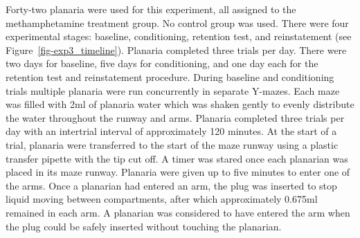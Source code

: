 \documentclass[
  jou,
  floatsintext,
  longtable,
  nolmodern,
  notxfonts,
  notimes,
  donotrepeattitle,
  colorlinks=true,linkcolor=blue,citecolor=blue,urlcolor=blue]{apa7}
\begin{document}
Forty-two planaria were used for this experiment, all assigned to the
methamphetamine treatment group. No control group was used. There
were four experimental stages: baseline, conditioning, retention test,
and reinstatement (see Figure~\ref{fig-exp3_timeline}). Planaria
completed three trials per day. There were two days for baseline, five
days for conditioning, and one day each for the retention test and
reinstatement procedure. During baseline and conditioning trials
multiple planaria were run concurrently in separate Y-mazes. Each maze
was filled with 2ml of planaria water which was shaken gently to evenly
distribute the water throughout the runway and arms. Planaria completed
three trials per day with an intertrial interval of approximately 120
minutes. At the start of a trial, planaria were transferred to the start
of the maze runway using a plastic transfer pipette with the tip cut
off. A timer was stared once each planarian was placed in its maze
runway. Planaria were given up to five minutes to enter one of the arms.
Once a planarian had entered an arm, the plug was inserted to stop
liquid moving between compartments, after which approximately 0.675ml
remained in each arm. A planarian was considered to have
entered the arm when the plug could be safely inserted without touching
the planarian.
\end{document}
